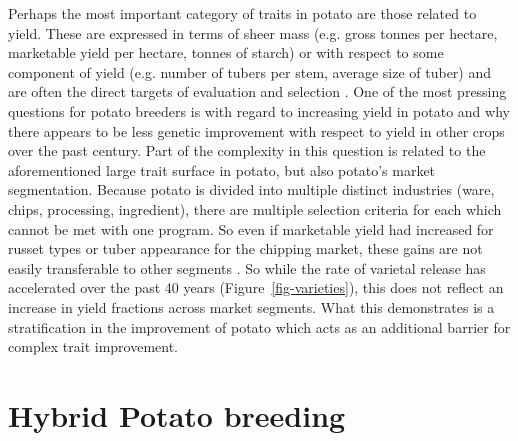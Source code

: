\begin{refsection}
Perhaps the most important category of traits in potato are those
related to yield. These are expressed in terms of sheer mass (e.g. gross
tonnes per hectare, marketable yield per hectare, tonnes of starch) or
with respect to some component of yield (e.g. number of tubers per stem,
average size of tuber) and are often the direct targets of evaluation
and selection \parencite{Tai1976,Lemaga1990,Haynes2001}. One of the most
pressing questions for potato breeders is with regard to increasing
yield in potato and why there appears to be less genetic improvement
with respect to yield in other crops over the past century. Part of the
complexity in this question is related to the aforementioned large trait
surface in potato, but also potato's market segmentation. Because potato
is divided into multiple distinct industries (ware, chips, processing,
ingredient), there are multiple selection criteria for each which cannot
be met with one program. So even if marketable yield had increased for
russet types or tuber appearance for the chipping market, these gains
are not easily transferable to other segments
\parencite{Douches1996,Hirsch2013}. So while the rate of varietal release has accelerated over the past 40 years (Figure~\ref{fig-varieties}), this does not reflect an increase in yield fractions across market segments.
What this demonstrates is a stratification in the improvement of potato which acts as an additional barrier for complex trait improvement.

\section{Hybrid Potato breeding}\label{hybrid-potato-breeding}


\end{refsection}

